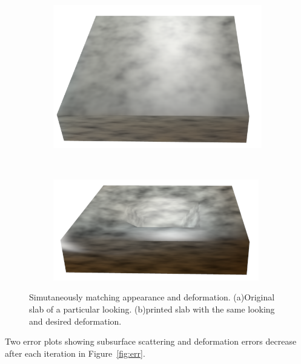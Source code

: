 \documentclass[annual]{acmsiggraph}
\begin{document}
\begin{figure}
\begin{subfigure}[b]{0.3\textwidth}
	\centering
 	\includegraphics[width=\textwidth]{figure/slab_origin.png}
   	\caption{}
    \label{fig:deformPhoto}
    \end{subfigure}
    ~ 
    \begin{subfigure}[b]{0.3\textwidth}
    \centering
  	\includegraphics[width=\textwidth]{figure/slab_deform.png}
    \caption{}
    \label{fig:deformPrint}
\end{subfigure}
\caption{Simutaneously matching appearance and deformation. 
(a)Original slab of a particular looking. (b)printed slab 
with the same looking and desired deformation.}
\label{fig:deform}
\end{figure}

Two error plots showing subsurface scattering and deformation errors decrease
after each iteration in Figure~\ref{fig:err}.
\end{document}
